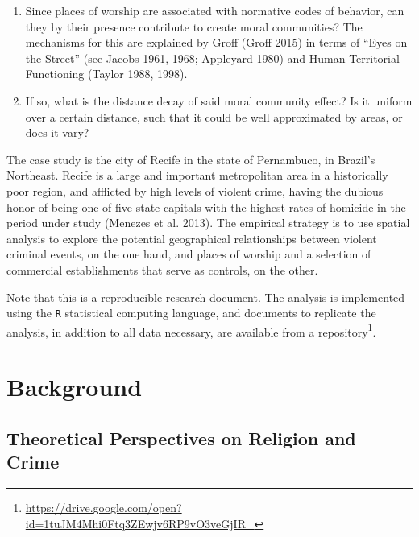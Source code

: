\documentclass[smallextended]{svjour3}       %
\begin{document}
\begin{enumerate}
\def\labelenumi{\arabic{enumi}.}
\item
  Since places of worship are associated with normative codes of
  behavior, can they by their presence contribute to create moral
  communities? The mechanisms for this are explained by Groff (Groff
  2015) in terms of ``Eyes on the Street'' (see Jacobs 1961, 1968;
  Appleyard 1980) and Human Territorial Functioning (Taylor 1988, 1998).
\item
  If so, what is the distance decay of said moral community effect? Is
  it uniform over a certain distance, such that it could be well
  approximated by areas, or does it vary?
\end{enumerate}

The case study is the city of Recife in the state of Pernambuco, in
Brazil's Northeast. Recife is a large and important metropolitan area in
a historically poor region, and afflicted by high levels of violent
crime, having the dubious honor of being one of five state capitals with
the highest rates of homicide in the period under study (Menezes et al.
2013). The empirical strategy is to use spatial analysis to explore the
potential geographical relationships between violent criminal events, on
the one hand, and places of worship and a selection of commercial
establishments that serve as controls, on the other.

Note that this is a reproducible research document. The analysis is
implemented using the \texttt{R} statistical computing language, and
documents to replicate the analysis, in addition to all data necessary,
are available from a
repository\footnote{\url{https://drive.google.com/open?id=1tuJM4Mhi0Ftq3ZEwjv6RP9vO3veGjIR_}}.

\hypertarget{background}{%
\section{Background}\label{background}}

\hypertarget{theoretical-perspectives-on-religion-and-crime}{%
\subsection{Theoretical Perspectives on Religion and
Crime}\label{theoretical-perspectives-on-religion-and-crime}}
\end{document}
